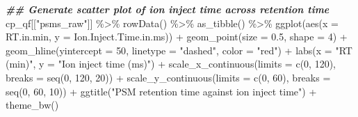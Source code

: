 \documentclass[9pt,a4paper,]{extarticle}
\newenvironment{Shaded}{\begin{snugshade}}{\end{snugshade}}
\newcommand{\AttributeTok}[1]{\textcolor[rgb]{0.77,0.63,0.00}{#1}}
\newcommand{\DecValTok}[1]{\textcolor[rgb]{0.00,0.00,0.81}{#1}}
\newcommand{\DocumentationTok}[1]{\textcolor[rgb]{0.56,0.35,0.01}{\textbf{\textit{#1}}}}
\newcommand{\FloatTok}[1]{\textcolor[rgb]{0.00,0.00,0.81}{#1}}
\newcommand{\FunctionTok}[1]{\textcolor[rgb]{0.00,0.00,0.00}{#1}}
\newcommand{\NormalTok}[1]{#1}
\newcommand{\SpecialCharTok}[1]{\textcolor[rgb]{0.00,0.00,0.00}{#1}}
\newcommand{\StringTok}[1]{\textcolor[rgb]{0.31,0.60,0.02}{#1}}
\begin{document}
\begin{Shaded}
\begin{Highlighting}[]
\DocumentationTok{\#\# Generate scatter plot of ion inject time across retention time}
\NormalTok{cp\_qf[[}\StringTok{"psms\_raw"}\NormalTok{]] }\SpecialCharTok{\%\textgreater{}\%}
  \FunctionTok{rowData}\NormalTok{() }\SpecialCharTok{\%\textgreater{}\%} 
  \FunctionTok{as\_tibble}\NormalTok{() }\SpecialCharTok{\%\textgreater{}\%}
  \FunctionTok{ggplot}\NormalTok{(}\FunctionTok{aes}\NormalTok{(}\AttributeTok{x =}\NormalTok{ RT.in.min, }\AttributeTok{y =}\NormalTok{ Ion.Inject.Time.in.ms)) }\SpecialCharTok{+}
  \FunctionTok{geom\_point}\NormalTok{(}\AttributeTok{size =} \FloatTok{0.5}\NormalTok{, }\AttributeTok{shape =} \DecValTok{4}\NormalTok{) }\SpecialCharTok{+}
  \FunctionTok{geom\_hline}\NormalTok{(}\AttributeTok{yintercept =} \DecValTok{50}\NormalTok{, }\AttributeTok{linetype =} \StringTok{"dashed"}\NormalTok{, }\AttributeTok{color =} \StringTok{"red"}\NormalTok{) }\SpecialCharTok{+}
  \FunctionTok{labs}\NormalTok{(}\AttributeTok{x =} \StringTok{"RT (min)"}\NormalTok{, }\AttributeTok{y =} \StringTok{"Ion inject time (ms)"}\NormalTok{) }\SpecialCharTok{+}
  \FunctionTok{scale\_x\_continuous}\NormalTok{(}\AttributeTok{limits =} \FunctionTok{c}\NormalTok{(}\DecValTok{0}\NormalTok{, }\DecValTok{120}\NormalTok{), }\AttributeTok{breaks =} \FunctionTok{seq}\NormalTok{(}\DecValTok{0}\NormalTok{, }\DecValTok{120}\NormalTok{, }\DecValTok{20}\NormalTok{)) }\SpecialCharTok{+}
  \FunctionTok{scale\_y\_continuous}\NormalTok{(}\AttributeTok{limits =} \FunctionTok{c}\NormalTok{(}\DecValTok{0}\NormalTok{, }\DecValTok{60}\NormalTok{), }\AttributeTok{breaks =} \FunctionTok{seq}\NormalTok{(}\DecValTok{0}\NormalTok{, }\DecValTok{60}\NormalTok{, }\DecValTok{10}\NormalTok{)) }\SpecialCharTok{+}
  \FunctionTok{ggtitle}\NormalTok{(}\StringTok{"PSM retention time against ion inject time"}\NormalTok{) }\SpecialCharTok{+}
  \FunctionTok{theme\_bw}\NormalTok{()}
\end{Highlighting}
\end{Shaded}
\end{document}
